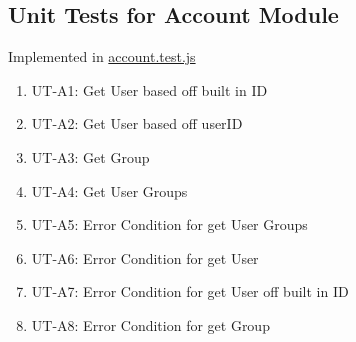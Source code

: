 \documentclass[12pt, titlepage]{article}
\begin{document}
\subsection{Unit Tests for Account Module}

Implemented in \href{https://github.com/DangJustin/CapstoneProject/blob/main/src/rev0_demo/server/tests/account.test.js}{account.test.js}

\begin{enumerate}
    \item UT-A1: Get User based off built in ID
    \item UT-A2: Get User based off userID
    \item UT-A3: Get Group
    \item UT-A4: Get User Groups
    \item UT-A5: Error Condition for get User Groups
    \item UT-A6: Error Condition for get User
    \item UT-A7: Error Condition for get User off built in ID
    \item UT-A8: Error Condition for get Group
\end{enumerate}







					
					
					
\end{document}
